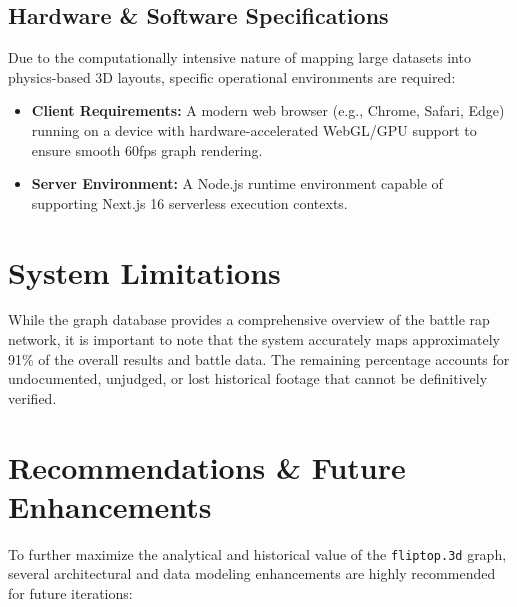 \documentclass[12pt,a4paper]{article}
\begin{document}
\subsection{Hardware \& Software Specifications}
Due to the computationally intensive nature of mapping large datasets into physics-based 3D layouts, specific operational environments are required:
\begin{itemize}
    \item \textbf{Client Requirements:} A modern web browser (e.g., Chrome, Safari, Edge) running on a device with hardware-accelerated WebGL/GPU support to ensure smooth 60fps graph rendering. 
    \item \textbf{Server Environment:} A Node.js runtime environment capable of supporting Next.js 16 serverless execution contexts.
\end{itemize}

\section{System Limitations}
While the graph database provides a comprehensive overview of the battle rap network, it is important to note that the system accurately maps approximately 91\% of the overall results and battle data. The remaining percentage accounts for undocumented, unjudged, or lost historical footage that cannot be definitively verified.

\section{Recommendations \& Future Enhancements}
To further maximize the analytical and historical value of the \texttt{fliptop.3d} graph, several architectural and data modeling enhancements are highly recommended for future iterations:
\end{document}
